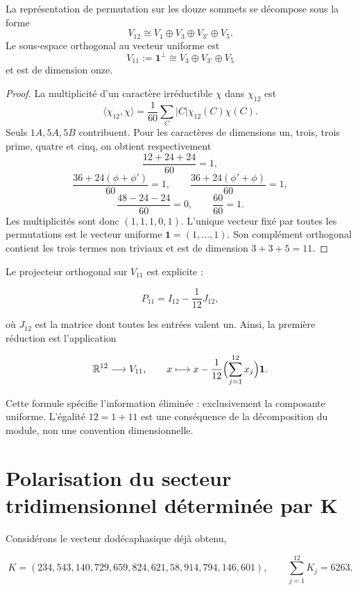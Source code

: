 \begin{theorem}
\label{thm:descomposicion-a5}
La représentation de permutation sur les douze sommets se décompose sous la forme
\[
V_{12}\cong V_1\oplus V_3\oplus V_{3'}\oplus V_5.
\]
Le sous-espace orthogonal au vecteur uniforme est
\[
V_{11}:=\mathbf1^\perp
\cong V_3\oplus V_{3'}\oplus V_5
\]
et est de dimension onze.
\end{theorem}

\begin{proof}
La multiplicité d'un caractère irréductible \(\chi\) dans \(\chi_{12}\) est
\[
\langle\chi_{12},\chi\rangle
=\frac1{60}\sum_C|C|\chi_{12}(C)\chi(C).
\]
Seuls \(1A,5A,5B\) contribuent. Pour les caractères de dimensions un, trois,
trois prime, quatre et cinq, on obtient respectivement
\[
\frac{12+24+24}{60}=1,
\]
\[
\frac{36+24(\phi+\phi')}{60}=1,
\qquad
\frac{36+24(\phi'+\phi)}{60}=1,
\]
\[
\frac{48-24-24}{60}=0,
\qquad
\frac{60}{60}=1.
\]
Les multiplicités sont donc \((1,1,1,0,1)\). L'unique vecteur fixé par
toutes les permutations est le vecteur uniforme
\(\mathbf1=(1,\ldots,1)\). Son complément orthogonal contient les trois
termes non triviaux et est de dimension \(3+3+5=11\).
\end{proof}

Le projecteur orthogonal sur \(V_{11}\) est explicite :

\[
P_{11}=I_{12}-\frac1{12}J_{12},
\]

où \(J_{12}\) est la matrice dont toutes les entrées valent un. Ainsi, la première
réduction est l'application

\[
\mathbb R^{12}\longrightarrow V_{11},
\qquad
x\longmapsto x-\frac1{12}\Bigl(\sum_{j=1}^{12}x_j\Bigr)\mathbf1.
\]

Cette formule spécifie l'information éliminée : exclusivement la
composante uniforme. L'égalité \(12=1+11\) est une conséquence de la
décomposition du module, non une convention dimensionnelle.

\section[Polarisation du secteur tridimensionnel]{Polarisation du secteur tridimensionnel déterminée par K}
\label{sec:reduccion-once-diez}

Considérons le vecteur dodécaphasique déjà obtenu,

\[
K=(234,543,140,729,659,824,621,58,914,794,146,601),
\qquad
\sum_{j=1}^{12}K_j=6263.
\]

